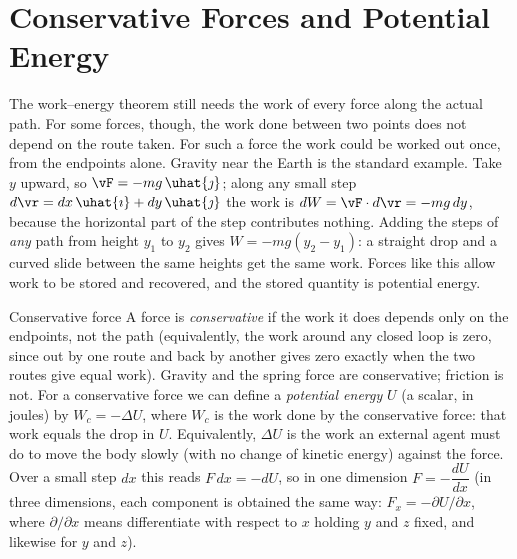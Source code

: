 \begin{figure}[htbp]
\centering
{}
\end{figure}

\section{Conservative Forces and Potential Energy}

The work--energy theorem still needs the work of every force along the actual path. For some forces, though, the work done between two points does not depend on the route taken.
For such a force the work could be worked out once, from the endpoints alone.
Gravity near the Earth is the standard example. Take $y$
upward, so $\vF=-mg\,\uhat{\jmath}$; along any
small step $d\vr=dx\,\uhat{\imath}+dy\,\uhat{\jmath}$ the work is $dW=\vF\cdot d\vr=-mg\,dy$, because the
horizontal part of the step contributes nothing. Adding the steps of \emph{any} path from height $y_1$
to $y_2$ gives $W=-mg(y_2-y_1)$: a straight drop and a curved slide between the same heights get the same work. Forces like this allow work to be stored and
recovered, and the stored quantity is potential energy.

\begin{defbox}{Conservative force}
A force is \emph{conservative} if the work it does depends only on the endpoints, not the path (equivalently,
the work around any closed loop is zero, since out by one route and back by another gives zero exactly
when the two routes give equal work).
Gravity and the spring force are conservative; friction is not.
For a conservative force we can define a \emph{potential energy} $U$ (a scalar, in joules) by
$W_c=-\Delta U$, where $W_c$ is the work done by the conservative force: that work equals the drop in
$U$. Equivalently, $\Delta U$ is the work an
external agent must do to move the body slowly (with no change of kinetic energy) against the force. Over
a small step $dx$ this reads $F\,dx=-dU$, so in one dimension $F=-\dfrac{dU}{dx}$ (in three dimensions,
each component is obtained the same way: $F_x=-\partial U/\partial x$, where $\partial/\partial x$ means
differentiate with respect to $x$ holding $y$ and $z$ fixed, and likewise for $y$ and $z$).
\end{defbox}

